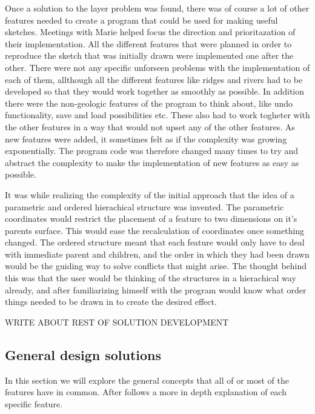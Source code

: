 \documentclass[a4paper,12pt]{article}
\begin{document}
Once a solution to the layer problem was found, there was of course a lot of other features needed to create a program that could be used for making useful sketches. Meetings with Marie helped focus the direction and prioritazation of their implementation. All the different features that were planned in order to reproduce the sketch that was initially drawn were implemented one after the other. There were not any specific unforseen problems with the implementation of each of them, allthough all the different features like ridges and rivers had to be developed so that they would work together as smoothly as possible. In addition there were the non-geologic features of the program to think about, like undo functionality, save and load possibilities etc. These also had to work togheter with the other features in a way that would not upset any of the other features. As new features were added, it sometimes felt as if the complexity was growing exponentially. The program code was therefore changed many times to 
try and abstract the complexity to make the implementation of new features as easy as possible.

It was while realizing the complexity of the initial approach that the idea of a parametric and ordered hierachical structure was invented. The parametric coordinates would restrict the placement of a feature to two dimensions on it's parents surface. This would ease the recalculation of coordinates once something changed. The ordered structure meant that each feature would only have to deal with immediate parent and children, and the order in which they had been drawn would be the guiding way to solve conflicts that might arise. The thought behind this was that the user would be thinking of the structures in a hierachical way already, and after familiarizing himself with the program would know what order things needed to be drawn in to create the desired effect.



WRITE ABOUT REST OF SOLUTION DEVELOPMENT



\subsection{General design solutions}
\label{subsec:generaldesign}
In this section we will explore the general concepts that all of or most of the features have in common. After follows a more in depth explanation of each specific feature.
\end{document}

